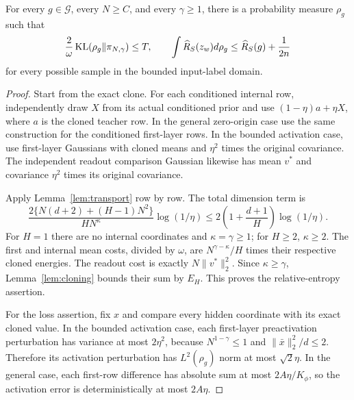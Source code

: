 \begin{lemma}
\label{lem:comparison}
For every $g\in\mathcal G$, every $N\ge C$, and every $\gamma\ge1$, there is a probability measure $\rho_g$ such that
\begin{equation}
 \frac2\omega\operatorname{KL}(\rho_g\|\pi_{N,\gamma})\le T,
 \qquad
 \int\widehat R_S(z_w)d\rho_g\le\widehat R_S(g)+\frac1{2n}
 \label{eq:comparison}
\end{equation}
for every possible sample in the bounded input-label domain.
\end{lemma}
\begin{proof}
Start from the exact clone. For each conditioned internal row, independently draw $X$ from its actual conditioned prior and use $(1-\eta)a+\eta X$, where $a$ is the cloned teacher row. In the general zero-origin case use the same construction for the conditioned first-layer rows. In the bounded activation case, use first-layer Gaussians with cloned means and $\eta^2$ times the original covariance. The independent readout comparison Gaussian likewise has mean $v^*$ and covariance $\eta^2$ times its original covariance.

Apply Lemma~\ref{lem:transport} row by row. The total dimension term is
\[
 \frac{2\{N(d+2)+(H-1)N^2\}}{HN^\kappa}\log(1/\eta)
 \le2\left(1+\frac{d+1}{H}\right)\log(1/\eta).
\]
For $H=1$ there are no internal coordinates and $\kappa=\gamma\ge1$; for $H\ge2$, $\kappa\ge2$. The first and internal mean costs, divided by $\omega$, are $N^{\gamma-\kappa}/H$ times their respective cloned energies. The readout cost is exactly $N\|v^*\|_2^2$. Since $\kappa\ge\gamma$, Lemma~\ref{lem:cloning} bounds their sum by $E_H$. This proves the relative-entropy assertion.

For the loss assertion, fix $x$ and compare every hidden coordinate with its exact cloned value. In the bounded activation case, each first-layer preactivation perturbation has variance at most $2\eta^2$, because $N^{1-\gamma}\le1$ and $\|\bar x\|_2^2/d\le2$. Therefore its activation perturbation has $L^2(\rho_g)$ norm at most $\sqrt2\eta$. In the general case, each first-row difference has absolute sum at most $2A\eta/K_\phi$, so the activation error is deterministically at most $2A\eta$.


\end{proof}
